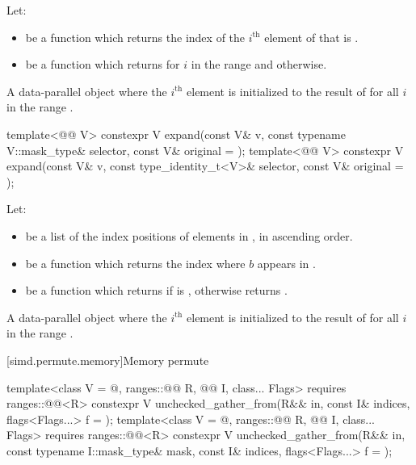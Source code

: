 \begin{itemdescr}
\pnum
Let:
\begin{itemize}
\item
{} be a function which returns the index
of the $i^\text{th}$ element of  that is .
\item
{} be a function which returns
 for $i$ in the range
 and  otherwise.
\end{itemize}

\pnum
\returns
A data-parallel object where the $i^\text{th}$
element is initialized to the result of 
for all $i$ in the range .
\end{itemdescr}

\begin{itemdecl}
template<@@ V>
  constexpr V expand(const V& v, const typename V::mask_type& selector, const V& original = {});
template<@@ V>
  constexpr V expand(const V& v, const type_identity_t<V>& selector, const V& original = {});
\end{itemdecl}

\begin{itemdescr}
\pnum
Let:
\begin{itemize}
\item
{} be a list of the index positions of 
elements in , in ascending order.
\item
{} be a function which returns the index
where $b$ appears in .
\item
{} be a function which returns
 if  is
, otherwise returns .
\end{itemize}

\pnum
\returns
A data-parallel object where the $i^\text{th}$
element is initialized to the result of 
for all $i$ in the range .
\end{itemdescr}

[simd.permute.memory]{Memory permute}

\begin{itemdecl}
template<class V = @\seebelow@, ranges::@@ R, @@ I, class... Flags>
  requires ranges::@@<R>
  constexpr V unchecked_gather_from(R&& in, const I& indices, flags<Flags...> f = {});
template<class V = @\seebelow@, ranges::@@ R, @@ I, class... Flags>
  requires ranges::@@<R>
  constexpr V unchecked_gather_from(R&& in, const typename I::mask_type& mask,
                                    const I& indices, flags<Flags...> f = {});
\end{itemdecl}

